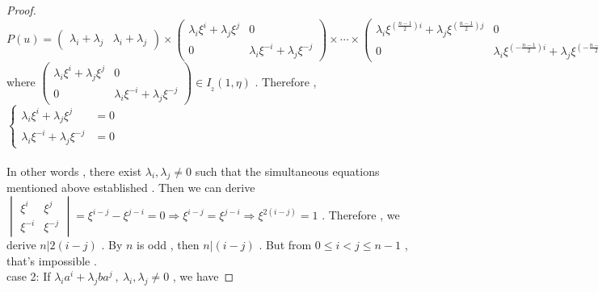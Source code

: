 \documentclass{article}
\begin{document}
\begin{proof}
\begin{equation*}
    P(u)=\begin{pmatrix}
          \lambda_i+\lambda_j&\lambda_i+\lambda_j
        \end{pmatrix}
        \times
        \begin{pmatrix}
            \lambda_i\xi^{\scriptscriptstyle i}+\lambda_j\xi^{\scriptscriptstyle j}&0\\
            0&\lambda_i\xi^{\scriptscriptstyle-i}+\lambda_j\xi^{\scriptscriptstyle-j}
        \end{pmatrix}
        \times\cdots\times
        \begin{pmatrix}
            \lambda_i\xi^{\scriptscriptstyle(\frac{n-1}{2})i}+\lambda_j\xi^{\scriptscriptstyle(\frac{n-1}{2})j}&0\\
            0&\lambda_i\xi^{(\scriptscriptstyle-\frac{n-1}{2})i}+\lambda_j\xi^{(\scriptscriptstyle-\frac{n-1}{2})j}
        \end{pmatrix}
\end{equation*}
where $\begin{pmatrix}
           \lambda_i\xi^{\scriptscriptstyle i}+\lambda_j\xi^{\scriptscriptstyle j}&0\\
            0&\lambda_i\xi^{\scriptscriptstyle-i}+\lambda_j\xi^{\scriptscriptstyle-j}
        \end{pmatrix}\in{I_{_2}}(1,\eta)$ . 
Therefore , 
$
\left\{
\begin{array}{ll}
\lambda_i\xi^{\scriptscriptstyle i}+\lambda_j\xi^{\scriptscriptstyle j}&=0\\
\lambda_i\xi^{\scriptscriptstyle-i}+\lambda_j\xi^{\scriptscriptstyle-j}&=0
\end{array}
\right.
$\\
\quad\\
In other words , there exist $\lambda_i,\lambda_j\neq0$ such that the simultaneous equations mentioned above established . Then we can derive 
$\begin{vmatrix}
\xi^{\scriptscriptstyle i}&\xi^{\scriptscriptstyle j}\\
\xi^{\scriptscriptstyle -i}&\xi^{\scriptscriptstyle -j}
\end{vmatrix}=\xi^{\scriptscriptstyle i-j}-\xi^{\scriptscriptstyle j-i}=0\Longrightarrow\xi^{\scriptscriptstyle i-j}=\xi^{\scriptscriptstyle j-i}\Longrightarrow\xi^{\scriptscriptstyle 2(i-j)}=1$ .
Therefore , we derive $n|2(i-j)$ . By $n$ is odd , then $n|(i-j)$ . But from $0\leq i<j\leq n-1$ , that's impossible . \\
case 2: If $\lambda_{i}a^{\scriptscriptstyle i}+\lambda_{j}ba^{\scriptscriptstyle j}\:,\:\lambda_i,\lambda_j\neq0$ , we have 

\end{proof}
\end{document}
